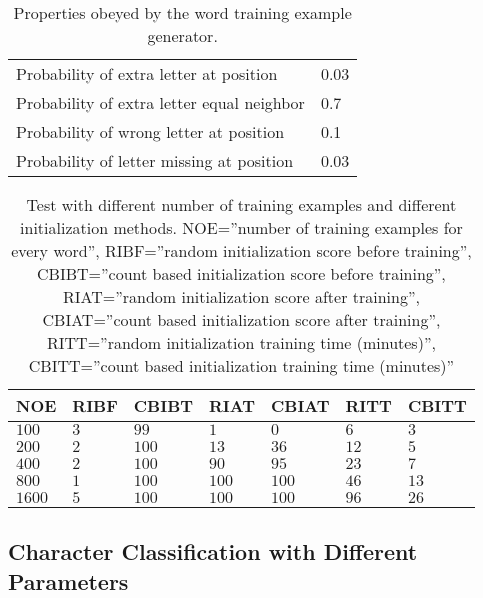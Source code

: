 \begin{table}[htb]
  \begin{center}
  \begin{tabular}{ l l }
    Probability of extra letter at position         & 0.03 \\
    Probability of extra letter equal neighbor      & 0.7 \\ 
    Probability of wrong letter at position         & 0.1 \\ 
    Probability of letter missing at position       & 0.03 \\
  \end{tabular}
\end{center}
\caption{Properties obeyed by the word training example generator.} 
\label{tab:word_generator_properties} 
\end{table}

\begin{table}[htb]
  \begin{center}
  \begin{tabular}{ l l l l l l l }
    NOE    & RIBF   & CBIBT  & RIAT    & CBIAT  & RITT & CBITT\\ \hline
    $100$  & $3$ & $99$   & $1$     & $0$    & $6$  & $3$\\ 
    $200$  & $2$ & $100$  & $13$    & $36$   & $12$ & $5$\\ 
    $400$  & $2$ & $100$  & $90$    & $95$   & $23$ & $7$\\
    $800$  & $1$ & $100$  & $100$   & $100$  & $46$ & $13$\\   
    $1600$ & $5$ & $100$  & $100$   & $100$  & $96$ & $26$\\  
  \end{tabular}
\end{center}
\caption{Test with different number of training examples and different initialization methods.
	 NOE=''number of training examples for every word'',
         RIBF=''random initialization score before training'',
         CBIBT=''count based initialization score before training'',
         RIAT=''random initialization score after training'',
         CBIAT=''count based initialization score after training'',
         RITT=''random initialization training time (minutes)'',
         CBITT=''count based initialization training time (minutes)''} 
\label{tab:word_classifier_results_generated_data} 
\end{table}

\subsection{Character Classification with Different Parameters}

